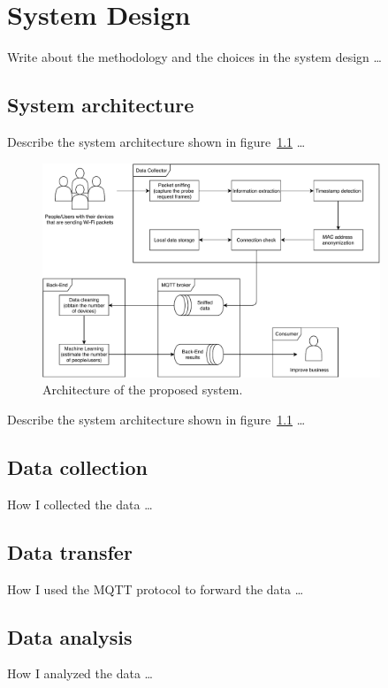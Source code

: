 \chapter{System Design}
\label{cha:system}
\vspace{0.5 cm} 

Write about the methodology and the choices in the system design \dots


\section{System architecture}
\label{sec:sysarc}
\vspace{0.2 cm} 

Describe the system architecture shown in figure~\ref{fig:architecture}  \dots

\begin{figure}[h]
\centering 
\includegraphics[width=0.9\textwidth]{images/architecture} 
\caption{Architecture of the proposed system.}
\label{fig:architecture}
\end{figure}

Describe the system architecture shown in figure~\ref{fig:architecture}  \dots


\section{Data collection}
\label{sec:collection}
\vspace{0.2 cm} 

How I collected the data \dots


\section{Data transfer}
\label{sec:transfer}
\vspace{0.2 cm} 

How I used the MQTT protocol to forward the data \dots


\section{Data analysis}
\label{sec:analysis}
\vspace{0.2 cm} 

How I analyzed the data \dots
